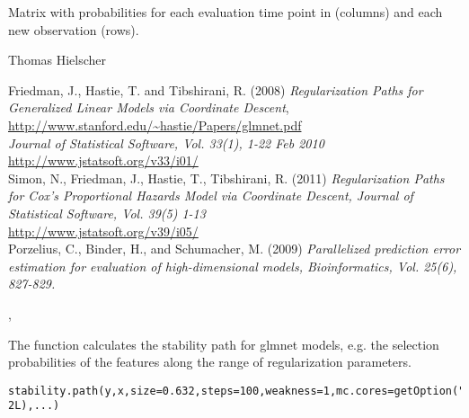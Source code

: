 \documentclass[letterpaper]{book}
\begin{document}
%
\begin{Value}
Matrix with probabilities for each evaluation time point in  (columns) and each new observation (rows). 
\end{Value}
%
\begin{Author}\relax
Thomas Hielscher \bsl{}
\end{Author}
%
\begin{References}\relax
Friedman, J., Hastie, T. and Tibshirani, R. (2008)
\emph{Regularization Paths for Generalized Linear Models via Coordinate
Descent},   \url{http://www.stanford.edu/~hastie/Papers/glmnet.pdf}\\{}
\emph{Journal of Statistical Software, Vol. 33(1), 1-22 Feb 2010}\\{}
\url{http://www.jstatsoft.org/v33/i01/}\\{}
Simon, N., Friedman, J., Hastie, T., Tibshirani, R. (2011)
\emph{Regularization Paths for Cox's Proportional Hazards Model via
Coordinate Descent, Journal of Statistical Software, Vol. 39(5)
1-13}\\{}
\url{http://www.jstatsoft.org/v39/i05/}\\{}
Porzelius, C., Binder, H., and Schumacher, M. (2009) 
\emph{Parallelized prediction error estimation for evaluation of high-dimensional models,
Bioinformatics, Vol. 25(6), 827-829.}
\end{References}
%
\begin{SeeAlso}\relax
{}, 
\end{SeeAlso}
%
\begin{Description}\relax
The function calculates the stability path for glmnet models, e.g. the selection probabilities of the features along the range of regularization parameters.
\end{Description}
%
\begin{Usage}
\begin{verbatim}
stability.path(y,x,size=0.632,steps=100,weakness=1,mc.cores=getOption("mc.cores", 2L),...)
\end{verbatim}
\end{Usage}
%
\end{document}
